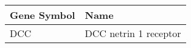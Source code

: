 \begin{tabular}{ll}
\toprule
Gene Symbol &                  Name \\
\midrule
        DCC & DCC netrin 1 receptor \\
\bottomrule
\end{tabular}
